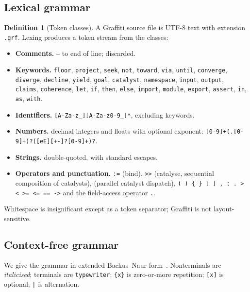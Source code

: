 \documentclass[11pt,twocolumn,a4paper]{article}
\theoremstyle{thmstyle}
\theoremstyle{definition}
\newtheorem{definition}[theorem]{Definition}
\theoremstyle{remark}
\begin{document}
\subsection{Lexical grammar}

\begin{definition}[Token classes]
\label{def:tokens}
A Graffiti source file is UTF-8 text with extension \texttt{.grf}.
Lexing produces a token stream from the classes:
\begin{itemize}[leftmargin=1.4em,itemsep=1pt]
\item \textbf{Comments.} \texttt{--} to end of line; discarded.
\item \textbf{Keywords.} \texttt{floor}, \texttt{project}, \texttt{seek},
\texttt{not}, \texttt{toward}, \texttt{via}, \texttt{until},
\texttt{converge}, \texttt{diverge}, \texttt{decline}, \texttt{yield},
\texttt{goal}, \texttt{catalyst}, \texttt{namespace}, \texttt{input},
\texttt{output}, \texttt{claims}, \texttt{coherence}, \texttt{let},
\texttt{if}, \texttt{then}, \texttt{else}, \texttt{import},
\texttt{module}, \texttt{export}, \texttt{assert}, \texttt{in},
\texttt{as}, \texttt{with}.
\item \textbf{Identifiers.} \texttt{[A-Za-z\_][A-Za-z0-9\_]*}, excluding
keywords.
\item \textbf{Numbers.} decimal integers and floats with optional
exponent: \texttt{[0-9]+(\allowbreak.[0-9]+)?\allowbreak([eE][+-]?[0-9]+)?}.
\item \textbf{Strings.} double-quoted, with standard escapes.
\item \textbf{Operators and punctuation.} \texttt{:=} (bind),
\texttt{>>} (catalyse, sequential composition of catalysts),
\texttt{\textbar\textbar} (parallel catalyst dispatch),
\texttt{( ) \{ \} [ ] , : . > < >= <= == ->} and the field-access
operator \texttt{.}.
\end{itemize}
Whitespace is insignificant except as a token separator; Graffiti is not
layout-sensitive.
\end{definition}

\subsection{Context-free grammar}

We give the grammar in extended Backus--Naur
form~\citep{backus1959,naur1963,aho2006}. Nonterminals are
\textit{italicised}; terminals are \texttt{typewriter}; \texttt{\{x\}} is
zero-or-more repetition; \texttt{[x]} is optional; \texttt{|} is
alternation.
\end{document}
